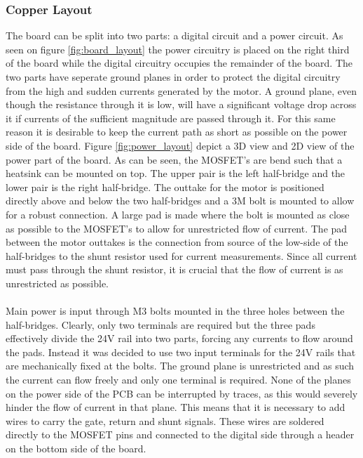 \subsubsection{Copper Layout} %
\label{ssub:copper_layout}
The board can be split into two parts: a digital circuit and a power circuit.
As seen on figure \ref{fig:board_layout} the power circuitry is placed on the right third of the board while the digital circuitry occupies the remainder of the board.
The two parts have seperate ground planes in order to protect the digital circuitry from the high and sudden currents generated by the motor.
A ground plane, even though the resistance through it is low, will have a significant voltage drop across it if currents of the sufficient magnitude are passed through it.
For this same reason it is desirable to keep the current path as short as possible on the power side of the board.
Figure \ref{fig:power_layout} depict a 3D view and 2D view of the power part of the board.
As can be seen, the MOSFET's are bend such that a heatsink can be mounted on top.
The upper pair is the left half-bridge and the lower pair is the right half-bridge.
The outtake for the motor is positioned directly above and below the two half-bridges and a 3M bolt is mounted to allow for a robust connection.
A large pad is made where the bolt is mounted as close as possible to the MOSFET's to allow for unrestricted flow of current.
The pad between the motor outtakes is the connection from source of the low-side of the half-bridges to the shunt resistor used for current measurements.
Since all current must pass through the shunt resistor, it is crucial that the flow of current is as unrestricted as possible.
\\~\\
Main power is input through M3 bolts mounted in the three holes between the half-bridges.
Clearly, only two terminals are required but the three pads effectively divide the 24V rail into two parts, forcing any currents to flow around the pads.
Instead it was decided to use two input terminals for the 24V rails that are mechanically fixed at the bolts.
The ground plane is unrestricted and as such the current can flow freely and only one terminal is required.
None of the planes on the power side of the PCB can be interrupted by traces, as this would severely hinder the flow of current in that plane.
This means that it is necessary to add wires to carry the gate, return and shunt signals.
These wires are soldered directly to the MOSFET pins and connected to the digital side through a header on the bottom side of the board. 

